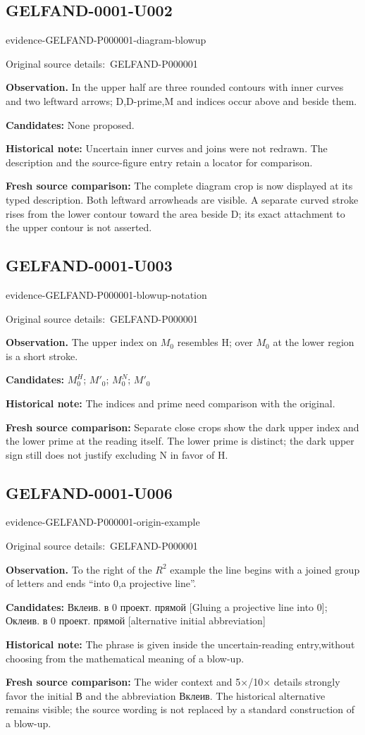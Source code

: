 \documentclass[11pt]{article}
\newcommand{\EvidenceBlock}[4]{%
 \par\smallskip\noindent\begin{minipage}{\linewidth}
 \begin{minipage}[t]{.47\linewidth}\vspace{0pt}\centering
 \csname evidence-#1-#2\endcsname\par
 {\scriptsize\SourceCropCaption\ #1}\par
 \end{minipage}\hfill
 \begin{minipage}[t]{.49\linewidth}\vspace{0pt}\raggedright
 {\small\color{orange!65!black}\textbf{#4} #3}\par
 \end{minipage}
 \end{minipage}\par\smallskip}
\newcommand{\SourceCropCaption}{Original source details:}\newcommand{\ReadingCaption}{Uncertain reading.}\newcommand{\IncompleteCaption}{Undeciphered passage.}\newcommand{\DiagramCaption}{Diagram and typed description.}
\begin{document}
\subsection*{GELFAND-0001-U002}
\EvidenceBlock{GELFAND-P000001}{diagram-blowup}{In the upper half are three rounded contours with inner curves and two leftward arrows; D,D-prime,M and indices occur above and beside them.}{Observation.}
\textbf{Candidates: } None proposed.\par
\textbf{Historical note: } Uncertain inner curves and joins were not redrawn. The description and the source-figure entry retain a locator for comparison.\par
\textbf{Fresh source comparison: } The complete diagram crop is now displayed at its typed description. Both leftward arrowheads are visible. A separate curved stroke rises from the lower contour toward the area beside D; its exact attachment to the upper contour is not asserted.\par
\subsection*{GELFAND-0001-U003}
\EvidenceBlock{GELFAND-P000001}{blowup-notation}{The upper index on \(M_0\) resembles H; over \(M_0\) at the lower region is a short stroke.}{Observation.}
\textbf{Candidates: } \(M_0^H\); \(M'_0\); \(M_0^N\); \(M'_0\)\par
\textbf{Historical note: } The indices and prime need comparison with the original.\par
\textbf{Fresh source comparison: } Separate close crops show the dark upper index and the lower prime at the reading itself. The lower prime is distinct; the dark upper sign still does not justify excluding N in favor of H.\par
\subsection*{GELFAND-0001-U006}
\EvidenceBlock{GELFAND-P000001}{origin-example}{To the right of the \(R^2\) example the line begins with a joined group of letters and ends “into 0,a projective line”.}{Observation.}
\textbf{Candidates: } Вклеив. в 0 проект. прямой [Gluing a projective line into 0]; Оклеив. в 0 проект. прямой [alternative initial abbreviation]\par
\textbf{Historical note: } The phrase is given inside the uncertain-reading entry,without choosing from the mathematical meaning of a blow-up.\par
\textbf{Fresh source comparison: } The wider context and 5×/10× details strongly favor the initial В and the abbreviation Вклеив. The historical alternative remains visible; the source wording is not replaced by a standard construction of a blow-up.\par
\end{document}
